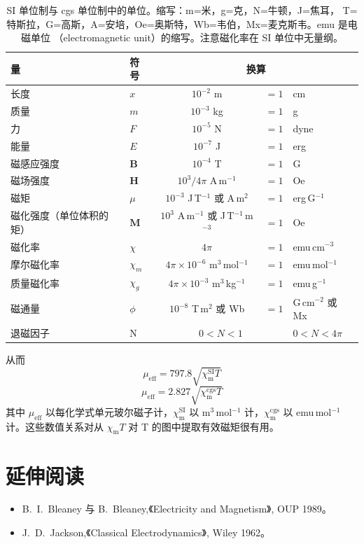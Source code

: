 \begin{table}[!ht]
\centering
\caption{SI 单位制与 cgs 单位制中的单位。缩写：m=米，g=克，N=牛顿，J=焦耳，
T=特斯拉，G=高斯，A=安培，Oe=奥斯特，Wb=韦伯，Mx=麦克斯韦。emu 是电磁单位
（electromagnetic unit）的缩写。注意磁化率在 SI 单位中无量纲。}
\begin{small}
\begin{tabular}{llcll}
\toprule
量 & 符号 & \multicolumn{3}{c}{换算} \\
\midrule
长度 & $x$ & $10^{-2}$ m & $=1$ & cm\\
质量 & $m$ & $10^{-3}$ kg & $=1$ & g\\
力 & $F$ & $10^{-5}$ N & $=1$ & dyne\\
能量 & $E$ & $10^{-7}$ J & $=1$ & erg\\
磁感应强度 & $\mathbf{B}$ & $10^{-4}$ T & $=1$ & G\\
磁场强度 & $\mathbf{H}$ & $10^{3}/4\pi$ A\,m$^{-1}$ & $=1$ & Oe\\
磁矩 & $\mu$ & $10^{-3}$ J\,T$^{-1}$ 或 A\,m$^{2}$ & $=1$ & erg\,G$^{-1}$\\
磁化强度（单位体积的矩） & $\mathbf{M}$ & $10^{3}$ A\,m$^{-1}$ 或 J\,T$^{-1}$\,m$^{-3}$ & $=1$ & Oe\\
磁化率 & $\chi$ & $4\pi$ & $=1$ & emu\,cm$^{-3}$\\
摩尔磁化率 & $\chi_m$ & $4\pi\times10^{-6}$ m$^{3}$\,mol$^{-1}$ & $=1$ & emu\,mol$^{-1}$\\
质量磁化率 & $\chi_g$ & $4\pi\times10^{-3}$ m$^{3}$\,kg$^{-1}$ & $=1$ & emu\,g$^{-1}$\\
磁通量 & $\phi$ & $10^{-8}$ T\,m$^{2}$ 或 Wb & $=1$ & G\,cm$^{-2}$ 或 Mx\\
退磁因子 & N & \multicolumn{2}{c}{$0<N<1$} & $0<N<4\pi$\\
\bottomrule
\end{tabular}
\end{small}
\end{table}

从而
\begin{equation*}
\mu_{\mathrm{eff}} = 797.8\sqrt{\chi_{\mathrm{m}}^{\mathrm{SI}}T}\tag{A.7}
\end{equation*}
\begin{equation*}
\mu_{\mathrm{eff}} = 2.827\sqrt{\chi_{\mathrm{m}}^{\mathrm{cgs}}T}\tag{A.8}
\end{equation*}
其中 $\mu_{\mathrm{eff}}$ 以每化学式单元玻尔磁子计，$\chi_{\mathrm{m}}^{\mathrm{SI}}$
以 m$^{3}$\,mol$^{-1}$ 计，$\chi_{\mathrm{m}}^{\mathrm{cgs}}$ 以 emu\,mol$^{-1}$
计。这些数值关系对从 $\chi_{\mathrm{m}}T$ 对 T 的图中提取有效磁矩很有用。

\section*{延伸阅读}

\begin{itemize}[itemsep=0.2em]
\item B.~I.~Bleaney 与 B.~Bleaney,《Electricity and Magnetism》, OUP 1989。
\item J.~D.~Jackson,《Classical Electrodynamics》, Wiley 1962。
\end{itemize}
